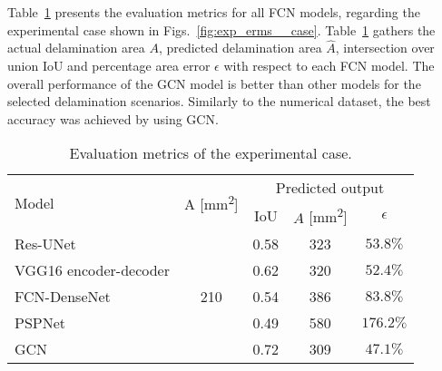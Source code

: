 Table~\ref{tab:rms_exp_case} presents the evaluation metrics for all FCN models, regarding the experimental case shown in Figs.~\ref{fig:exp_erms__case}.
Table~\ref{tab:rms_exp_case} gathers the actual delamination area \(A\), predicted delamination area \(\hat{A}\), intersection over union IoU and percentage area error \(\epsilon\) with respect to each FCN model. 
The overall performance of the GCN model is better than other models for the selected delamination scenarios.
Similarly to the numerical dataset, the best accuracy was achieved by using GCN.
\begin{table}[!ht]
	\centering
	\caption{Evaluation metrics of the experimental case.}
	\label{tab:rms_exp_case}
	\begin{tabular}{lcccc}
		\toprule
		\multirow{2}{*}{Model} & \multicolumn{1}{c}{\multirow{2}{*}{A [mm\textsuperscript{2}]}} & \multicolumn{3}{c}{Predicted output} \\ 
		\cmidrule(lr){3-5} & & \multicolumn{1}{c}{IoU} & \multicolumn{1}{c}{\(\hat{A}\) [mm\textsuperscript{2}]} & \(\epsilon\) \\ \midrule
		Res-UNet & \multirow{5}{*}{210} & \multicolumn{1}{c}{0.58} & \multicolumn{1}{c}{323}  & \(53.8\%\) \\ 
		VGG16 encoder-decoder &  & \multicolumn{1}{c}{0.62} & \multicolumn{1}{c}{320} & \(52.4\%\) 
		\\ 
		FCN-DenseNet &  & \multicolumn{1}{c}{0.54} & \multicolumn{1}{c}{386} & \(83.8\%\) \\ 
		PSPNet &  & \multicolumn{1}{c}{0.49} & \multicolumn{1}{c}{580} & \(176.2\%\) 
		\\ 
		GCN &  & \multicolumn{1}{c}{0.72} & \multicolumn{1}{c}{309} & \(47.1\%\) 
		\\ 
		\bottomrule
	\end{tabular}		
\end{table}
